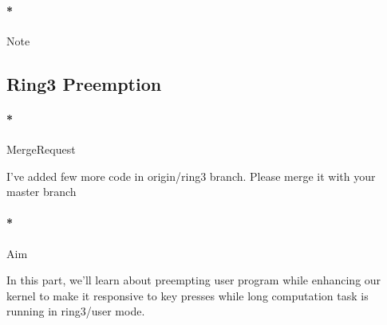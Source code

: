 \documentclass[]{article}
\newenvironment{Shaded}{}{}
\newcommand{\ExtensionTok}[1]{{#1}}
\newcommand{\NormalTok}[1]{{#1}}
\let\oldparagraph\paragraph
\renewcommand{\paragraph}[1]{\oldparagraph{#1}\mbox{}}
\begin{document}
\paragraph*{Note}\label{note-11}

\subsection{Ring3 Preemption}\label{ring3-preemption}

\paragraph*{MergeRequest}\label{mergerequest-10}

I've added few more code in origin/ring3 branch. Please merge it with
your master branch

\begin{Shaded}
\end{Shaded}

\paragraph*{Aim}\label{aim-10}

In this part, we'll learn about preempting user program while enhancing
our kernel to make it responsive to key presses while long computation
task is running in ring3/user mode.
\end{document}
